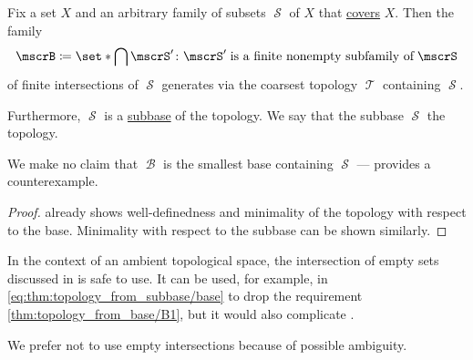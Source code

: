 \begin{proposition}\label{thm:topology_from_subbase}
  Fix a set \( X \) and an arbitrary family of subsets \( \mscrS \) of \( X \) that \hyperref[def:set_cover]{covers} \( X \). Then the family
  \begin{equation}\label{eq:thm:topology_from_subbase/base}
    \mscrB \coloneqq \set*{ \bigcap \mscrS' \colon \mscrS' \T{is a finite nonempty subfamily of} \mscrS }
  \end{equation}
  of finite intersections of \( \mscrS \) generates via  the coarsest topology \( \mscrT \) containing \( \mscrS \).

  Furthermore, \( \mscrS \) is a \hyperref[def:topological_subbase]{subbase} of the topology. We say that the subbase \( \mscrS \)  the topology.
\end{proposition}
\begin{comments}
  \item We make no claim that \( \mscrB \) is the smallest base containing \( \mscrS \) ---  provides a counterexample.
\end{comments}
\begin{proof}
   already shows well-definedness and minimality of the topology with respect to the base. Minimality with respect to the subbase can be shown similarly.
\end{proof}

\begin{remark}\label{rem:subbase_and_empty_intersection}
  In the context of an ambient topological space, the intersection of empty sets discussed in  is safe to use. It can be used, for example, in \eqref{eq:thm:topology_from_subbase/base} to drop the requirement \ref{thm:topology_from_base/B1}, but it would also complicate .

  We prefer not to use empty intersections because of possible ambiguity.
\end{remark}

